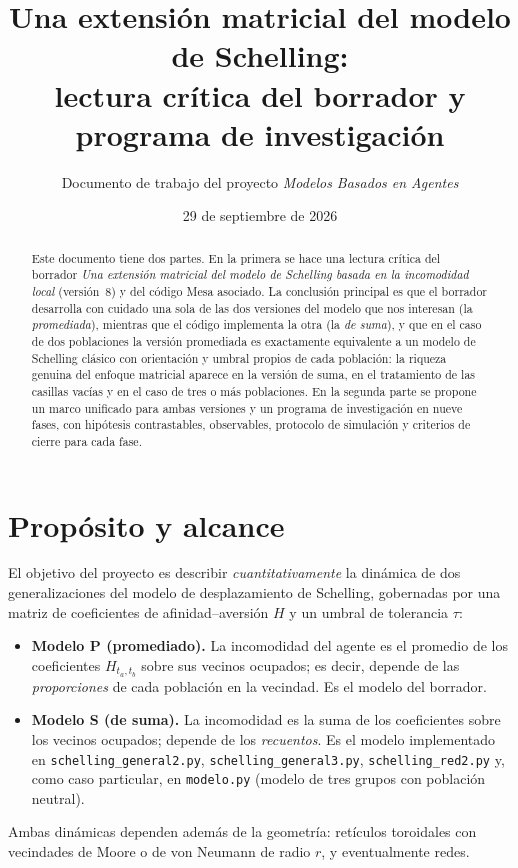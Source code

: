 \documentclass[11pt,a4paper]{article}
\title{Una extensión matricial del modelo de Schelling:\\
lectura crítica del borrador y programa de investigación}
\author{Documento de trabajo del proyecto \emph{Modelos Basados en Agentes}}
\date{29 de septiembre de 2026}
\theoremstyle{plain}
\theoremstyle{definition}
\theoremstyle{remark}
\newcommand{\modP}{\textsf{P}}
\newcommand{\modS}{\textsf{S}}
\begin{document}
\maketitle

\begin{abstract}
Este documento tiene dos partes. En la primera se hace una lectura crítica del
borrador \emph{Una extensión matricial del modelo de Schelling basada en la
incomodidad local} (versión~8) y del código Mesa asociado. La conclusión
principal es que el borrador desarrolla con cuidado una sola de las dos
versiones del modelo que nos interesan (la \emph{promediada}), mientras que el
código implementa la otra (la \emph{de suma}), y que en el caso de dos
poblaciones la versión promediada es exactamente equivalente a un modelo de
Schelling clásico con orientación y umbral propios de cada población: la
riqueza genuina del enfoque matricial aparece en la versión de suma, en el
tratamiento de las casillas vacías y en el caso de tres o más poblaciones. En la
segunda parte se propone un marco unificado para ambas versiones y un programa
de investigación en nueve fases, con hipótesis contrastables, observables,
protocolo de simulación y criterios de cierre para cada fase.
\end{abstract}

\tableofcontents

\section{Propósito y alcance}

El objetivo del proyecto es describir \emph{cuantitativamente} la dinámica de
dos generalizaciones del modelo de desplazamiento de Schelling, gobernadas por
una matriz de coeficientes de afinidad--aversión $H$ y un umbral de tolerancia
$\tau$:
\begin{itemize}
  \item \textbf{Modelo \modP{} (promediado).} La incomodidad del agente es el
  promedio de los coeficientes $H_{t_a,t_b}$ sobre sus vecinos ocupados; es
  decir, depende de las \emph{proporciones} de cada población en la vecindad.
  Es el modelo del borrador.
  \item \textbf{Modelo \modS{} (de suma).} La incomodidad es la suma de los
  coeficientes sobre los vecinos ocupados; depende de los \emph{recuentos}.
  Es el modelo implementado en \texttt{schelling\_general2.py},
  \texttt{schelling\_general3.py}, \texttt{schelling\_red2.py} y, como caso
  particular, en \texttt{modelo.py} (modelo de tres grupos con población
  neutral).
\end{itemize}
Ambas dinámicas dependen además de la geometría: retículos toroidales con
vecindades de Moore o de von Neumann de radio $r$, y eventualmente redes.
\end{document}

